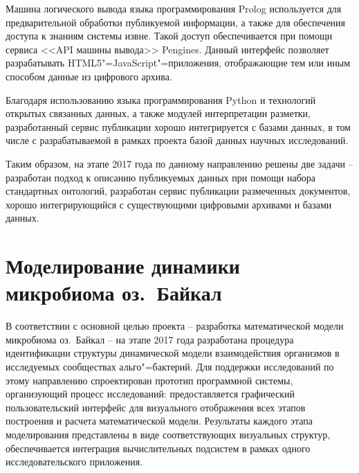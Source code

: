 \documentclass[a4paper,12pt,openany,final]{extreport}
\begin{document}
Машина логического вывода языка программирования Prolog используется для предварительной обработки публикуемой информации, а также для обеспечения доступа к знаниям системы извне. Такой доступ обеспечивается при помощи сервиса <<API машины вывода>> Pengines. Данный интерфейс  позволяет разрабатывать HTML5"=JavaScript"=приложения, отображающие тем или иным способом данные из цифрового архива.

Благодаря использованию языка программирования Python и технологий открытых связанных данных, а также модулей интерпретации разметки, разработанный сервис публикации хорошо интегрируется с базами данных, в том числе с разрабатываемой в рамках проекта базой данных научных исследований.

Таким образом, на этапе 2017 года по данному направлению решены две задачи -- разработан подход к описанию публикуемых данных при помощи набора стандартных онтологий, разработан сервис публикации размеченных документов, хорошо интегрирующийся с существующими цифровыми архивами и базами данных.

\chapter{Моделирование динамики микробиома оз.~Байкал}\label{chap:9}

В соответствии с основной целью проекта -- разработка математической модели микробиома оз.~Байкал -- на этапе 2017 года разработана процедура идентификации структуры динамической модели взаимодействия организмов в исследуемых сообществах альго"=бактерий. Для поддержки исследований по этому направлению спроектирован прототип программной системы, организующий процесс исследований: предоставляется графический пользовательский интерфейс для визуального отображения всех этапов построения и расчета математической модели.  Результаты каждого этапа моделирования представлены в виде соответствующих визуальных структур, обеспечивается интеграция вычислительных подсистем в рамках одного исследовательского приложения.
\end{document}
